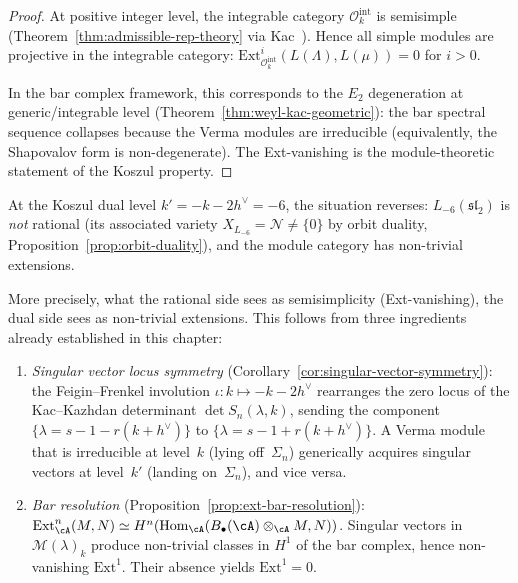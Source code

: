 \begin{proof}
At positive integer level, the integrable category
$\mathcal{O}_k^{\mathrm{int}}$ is semisimple
(Theorem~\ref{thm:admissible-rep-theory} via Kac~\cite{Kac}).
Hence all simple modules are projective in the integrable
category: $\mathrm{Ext}^i_{\mathcal{O}_k^{\mathrm{int}}}
(L(\Lambda), L(\mu)) = 0$ for $i > 0$.

In the bar complex framework, this corresponds to the $E_2$
degeneration at generic/integrable level
(Theorem~\ref{thm:weyl-kac-geometric}): the bar spectral
sequence collapses because the Verma modules are irreducible
(equivalently, the Shapovalov form is non-degenerate).  The
Ext-vanishing is the module-theoretic statement of the Koszul
property.
\end{proof}

\begin{proposition}
\label{prop:ext-koszul-dual-level}
At the Koszul dual level $k' = -k - 2h^\vee = -6$, the situation
reverses: $L_{-6}(\mathfrak{sl}_2)$ is \emph{not} rational
(its associated variety
$X_{L_{-6}} = \mathcal{N} \neq \{0\}$ by orbit duality,
Proposition~\ref{prop:orbit-duality}),
and the module category has non-trivial extensions.

More precisely, what the rational side sees as semisimplicity
(Ext-vanishing), the dual side sees as non-trivial extensions.
This follows from three ingredients already established in this
chapter:
\begin{enumerate}[label=\textup{(\roman*)}]
\item \emph{Singular vector locus symmetry}
  (Corollary~\ref{cor:singular-vector-symmetry}): the
  Feigin--Frenkel involution
  $\iota\colon k \mapsto -k - 2h^\vee$ rearranges the zero locus
  of the Kac--Kazhdan determinant $\det S_n(\lambda, k)$,
  sending the component $\{\lambda = s{-}1{-}r(k{+}h^\vee)\}$ to
  $\{\lambda = s{-}1{+}r(k{+}h^\vee)\}$.  A Verma module that is
  irreducible at level~$k$ (lying off~$\Sigma_n$) generically
  acquires singular vectors at level~$k'$ (landing on~$\Sigma_n$),
  and vice versa.

\item \emph{Bar resolution} (Proposition~\ref{prop:ext-bar-resolution}):
  $\mathrm{Ext}^n_\cA(M, N) \simeq
  H^n(\mathrm{Hom}_\cA(B_\bullet(\cA) \otimes_\cA M, N))$.
  Singular vectors in~$\mathcal{M}(\lambda)_k$ produce non-trivial
  classes in $H^1$ of the bar complex, hence non-vanishing
  $\mathrm{Ext}^1$.  Their absence yields $\mathrm{Ext}^1 = 0$.


\end{enumerate}
\end{proposition}

